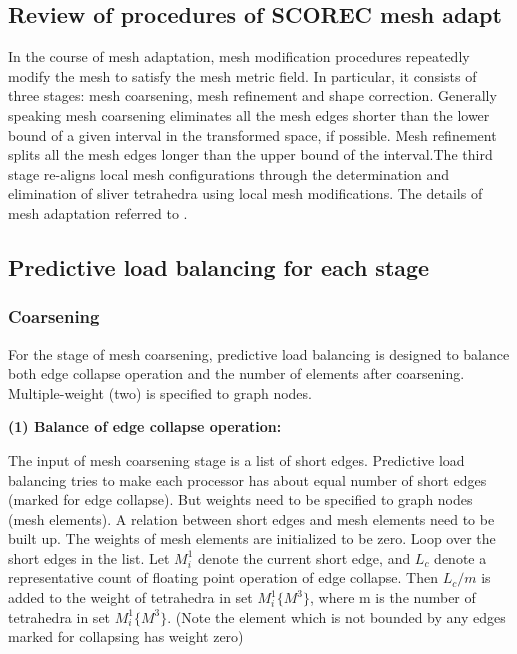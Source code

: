 \subsection{Review of procedures of SCOREC mesh adapt}
In the course of mesh adaptation, mesh modification procedures
repeatedly modify the mesh to satisfy the mesh metric field. In
particular, it consists of three stages: mesh coarsening, mesh
refinement and shape correction. Generally speaking mesh coarsening
eliminates all the mesh edges shorter than the lower bound of a given
interval in the transformed space, if possible. Mesh refinement splits all the mesh edges longer than the upper bound of the interval.The third stage re-aligns local mesh configurations through the determination and elimination of sliver tetrahedra using local mesh modifications\cite{Li}. The details of mesh adaptation referred to \cite{Li}.

\subsection{Predictive load balancing for each stage}
\subsubsection{Coarsening}
For the stage of mesh coarsening, predictive load balancing is
designed to balance both edge collapse operation and the number of
elements after coarsening. Multiple-weight (two) is specified to graph
nodes.

{\bf (1) Balance of edge collapse operation:}

The input of mesh coarsening stage is a list of short edges. Predictive
load balancing tries to make each processor has about equal number of
short edges (marked for edge collapse). But weights need to be
specified to graph nodes (mesh elements). A relation between short
edges and mesh elements need to be built up. 
The weights of mesh elements are initialized to be zero. Loop over the
short edges in the list. Let \begin{math}M_i^1 \end{math} denote the
current short edge, and \begin{math}L_c \end{math} denote a
representative count of floating point operation of edge collapse. Then \begin{math} L_c/m
\end{math} is added to the weight of tetrahedra in set \begin{math}
  M_i^1\{M^3\} \end{math}, where m is the number of tetrahedra in set \begin{math}
  M_i^1\{M^3\} \end{math}. (Note the element which is not bounded by any
  edges marked for collapsing has weight zero)

